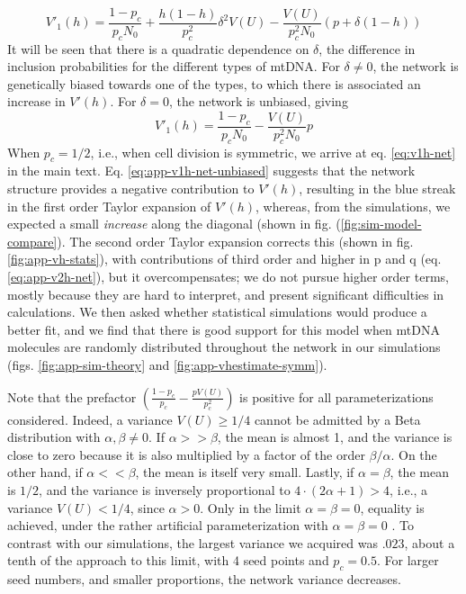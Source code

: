 \documentclass{article}
\begin{document}
\begin{appendices}
\begin{equation}
V'_1(h) = \frac{1-p_c}{p_c N_0}
        +\frac{h(1-h)}{p_c^2}\delta^2V(U)
        -\frac{V(U)}{p_c^2N_0}(p+\delta (1-h))
\end{equation}
It will be seen that there is a quadratic dependence on $\delta$, the difference in inclusion probabilities for the different types of mtDNA. For $\delta\neq 0$, the network is genetically biased towards one of the types, to which there is associated an increase in $V'(h)$. For $\delta=0$, the network is unbiased, giving
\begin{equation}\label{eq:app-v1h-net-unbiased}
V'_1(h) = \frac{1-p_c}{p_c N_0}
        -\frac{V(U)}{p_c^2N_0}p
\end{equation}
When $p_c=1/2$, i.e., when cell division is symmetric, we arrive at eq. \ref{eq:v1h-net} in the main text. Eq. \ref{eq:app-v1h-net-unbiased} suggests that the network structure provides a negative contribution to $V'(h)$, resulting in the blue streak in the first order Taylor expansion of $V'(h)$, whereas, from the simulations, we expected a small \textit{increase} along the diagonal (shown in fig. (\ref{fig:sim-model-compare}). The second order Taylor expansion corrects this (shown in fig. \ref{fig:app-vh-stats}), with contributions of third order and higher in p and q (eq. \ref{eq:app-v2h-net}), but it overcompensates; we do not pursue higher order terms, mostly because they are hard to interpret, and present significant difficulties in calculations. We then asked whether statistical simulations would produce a better fit, and we find that there is good support for this model when mtDNA molecules are randomly distributed throughout the network in our simulations (figs. \ref{fig:app-sim-theory} and \ref{fig:app-vhestimate-symm}).

Note that the prefactor $(\frac{1-p_c}{p_c}-\frac{pV(U)}{p_c^2})$ is positive for all parameterizations considered. Indeed, a variance $V(U)\geq 1/4$ cannot be admitted by a Beta distribution with $\alpha,\beta\neq 0$. If $\alpha>>\beta$, the mean is almost 1, and the variance is close to zero because it is also multiplied by a factor of the order $\beta/\alpha$. On the other hand, if $\alpha<<\beta$, the mean is itself very small. Lastly, if $\alpha=\beta$, the mean is $1/2$, and the variance is inversely proportional to $4\cdot(2\alpha+1)>4$, i.e., a variance $V(U)<1/4$, since $\alpha>0$. Only in the limit $\alpha=\beta=0$, equality is achieved, under the rather artificial parameterization with $\alpha =\beta = 0$ \citep{johnson1995continuous}. To contrast with our simulations, the largest variance we acquired was $.023$, about a tenth of the approach to this limit, with 4 seed points and $p_c=0.5$. For larger seed numbers, and smaller proportions, the network variance decreases.


\end{appendices}
\end{document}
